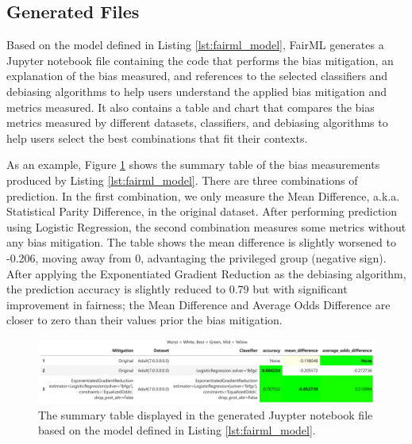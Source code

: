 \documentclass[sigconf,review]{acmart}
\begin{document}
	\subsection{Generated Files}
	\label{sec:generated_files}
	Based on the model defined in Listing \ref{lst:fairml_model}, FairML generates a Jupyter notebook file containing the code that performs the bias mitigation, an explanation of the bias measured, and references to the selected classifiers and debiasing algorithms to help users understand the applied bias mitigation and metrics measured. It also contains a table and chart that compares the bias metrics measured by different datasets, classifiers, and debiasing algorithms to help users select the best combinations that fit their contexts. 
	
	As an example, Figure \ref{fig:table-output} shows the summary table of the bias measurements produced by Listing \ref{lst:fairml_model}. There are three combinations of prediction. In the first combination, we only measure the Mean Difference, a.k.a. Statistical Parity Difference, in the original dataset. After performing prediction using Logistic Regression, the second combination measures some metrics without any bias mitigation. The table shows the mean difference is slightly worsened to -0.206, moving away from 0, advantaging the privileged group (negative sign). After applying the Exponentiated Gradient Reduction as the debiasing algorithm, the prediction accuracy is slightly reduced to 0.79 but with significant improvement in fairness; the Mean Difference and Average Odds Difference are closer to zero than their values prior the bias mitigation.
	
	
	\begin{figure}
		\includegraphics[width=\linewidth]{figures/table-output}
		\caption{The summary table displayed in the generated Juypter notebook file based on the model defined in Listing \ref{lst:fairml_model}.}
		\label{fig:table-output}
	\end{figure}
	
\end{document}
